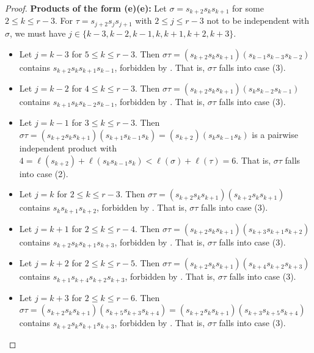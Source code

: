 \documentclass{amsart}
\theoremstyle{definition}
\begin{document}
\begin{appendices}
\begin{proof}
\noindent \textbf{Products of the form (e)(e):}
    Let $\sigma = s_{k+2}s_ks_{k+1}$ for some $2 \le k \le r-3$. For $\tau=s_{j+2}s_js_{j+1}$ with $2 \le j \le r-3$ not to be independent with $\sigma$, we must have $j\in\{k-3,k-2,k-1,k,k+1,k+2,k+3\}$.
    \begin{itemize}
        \item Let $j=k-3$ for $5\leq k\leq r-3$. Then $\sigma\tau=(s_{k+2}s_ks_{k+1})(s_{k-1}s_{k-3}s_{k-2})$ contains $s_{k+2}s_ks_{k+1}s_{k-1}$, forbidden by . That is, $\sigma\tau$ falls into case (3).
        \item Let $j=k-2$ for $4\leq k\leq r-3$. Then $\sigma\tau=(s_{k+2}s_ks_{k+1})(s_{k}s_{k-2}s_{k-1})$ contains $s_{k+1}s_ks_{k-2}s_{k-1}$, forbidden by . That is, $\sigma\tau$ falls into case (3).
        \item Let $j=k-1$ for $3\leq k\leq r-3$. Then $\sigma\tau=(s_{k+2}s_ks_{k+1})(s_{k+1}s_{k-1}s_{k})=(s_{k+2})(s_ks_{k-1}s_k)$ is a pairwise independent product with $4=\ell(s_{k+2})+\ell(s_{k}s_{k-1}s_k)<\ell(\sigma)+\ell(\tau)=6$. That is, $\sigma\tau$ falls into case (2).
        \item Let $j=k$ for $2\leq k\leq r-3$. Then $\sigma\tau=(s_{k+2}s_ks_{k+1})(s_{k+2}s_ks_{k+1})$ contains $s_ks_{k+1}s_{k+2}$, forbidden by . That is, $\sigma\tau$ falls into case (3).
        \item Let $j=k+1$ for $2\leq k\leq r-4$. Then $\sigma\tau=(s_{k+2}s_ks_{k+1})(s_{k+3}s_{k+1}s_{k+2})$ contains $s_{k+2}s_ks_{k+1}s_{k+3}$, forbidden by . That is, $\sigma\tau$ falls into case (3).
        \item Let $j=k+2$ for $2\leq k\leq r-5$. Then $\sigma\tau=(s_{k+2}s_ks_{k+1})(s_{k+4}s_{k+2}s_{k+3})$ contains $s_{k+1}s_{k+4}s_{k+2}s_{k+3}$, forbidden by . That is, $\sigma\tau$ falls into case (3).
        \item Let $j=k+3$ for $2\leq k\leq r-6$. Then $\sigma\tau=(s_{k+2}s_ks_{k+1})(s_{k+5}s_{k+3}s_{k+4})=(s_{k+2}s_ks_{k+1})(s_{k+3}s_{k+5}s_{k+4})$ contains $s_{k+2}s_ks_{k+1}s_{k+3}$, forbidden by . That is, $\sigma\tau$ falls into case (3). 
    \end{itemize}
    
\smallskip


\end{proof}
\end{appendices}
\end{document}
